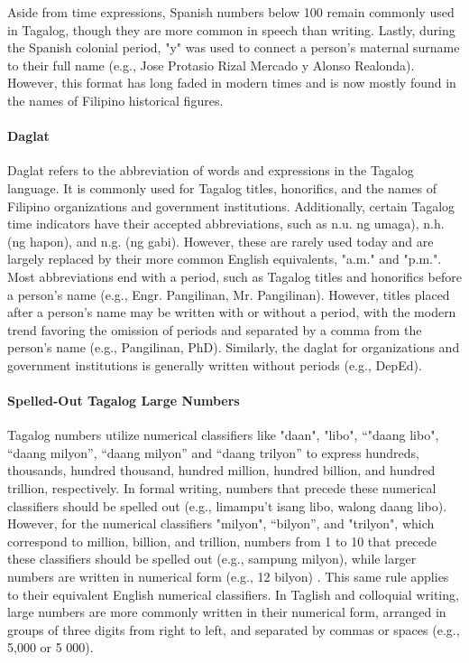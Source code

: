 \documentclass[journal]{./IEEE/IEEEtran}
\begin{document}
Aside from time expressions, Spanish numbers below 100 remain commonly used in Tagalog, though they are more common in speech than writing. Lastly, during the Spanish colonial period, "y" was used to connect a person's maternal surname to their full name (e.g., Jose Protasio Rizal Mercado y Alonso Realonda). However, this format has long faded in modern times and is now mostly found in the names of Filipino historical figures. \\

\paragraph{Daglat}

Daglat refers to the abbreviation of words and expressions in the Tagalog language. It is commonly used for Tagalog titles, honorifics, and the names of Filipino organizations and government institutions. Additionally, certain Tagalog time indicators have their accepted abbreviations, such as n.u. ng umaga), n.h. (ng hapon), and n.g. (ng gabi). However, these are rarely used today and are largely replaced by their more common English equivalents, "a.m." and "p.m.". \\

Most abbreviations end with a period, such as Tagalog titles and honorifics before a person’s name (e.g., Engr. Pangilinan, Mr. Pangilinan). However, titles placed after a person's name may be written with or without a period, with the modern trend favoring the omission of periods and separated by a comma from the person’s name (e.g., Pangilinan, PhD). Similarly, the daglat for organizations and government institutions is generally written without periods (e.g., DepEd). \\

\paragraph{Spelled-Out Tagalog Large Numbers}

Tagalog numbers utilize numerical classifiers like "daan", "libo", “"daang libo", “daang milyon”, “daang milyon” and “daang trilyon” to express hundreds, thousands, hundred thousand, hundred million, hundred billion, and hundred trillion, respectively. In formal writing, numbers that precede these numerical classifiers should be spelled out (e.g., limampu’t isang libo, walong daang libo). However, for the numerical classifiers "milyon", “bilyon”, and "trilyon", which correspond to million, billion, and trillion, numbers from 1 to 10 that precede these classifiers should be spelled out (e.g., sampung milyon), while larger numbers are written in numerical form (e.g., 12 bilyon) {\cite{KWFManwal}}. This same rule applies to their equivalent English numerical classifiers. In Taglish and colloquial writing, large numbers are more commonly written in their numerical form, arranged in groups of three digits from right to left, and separated by commas or spaces (e.g., 5,000 or 5 000). \\
\end{document}
